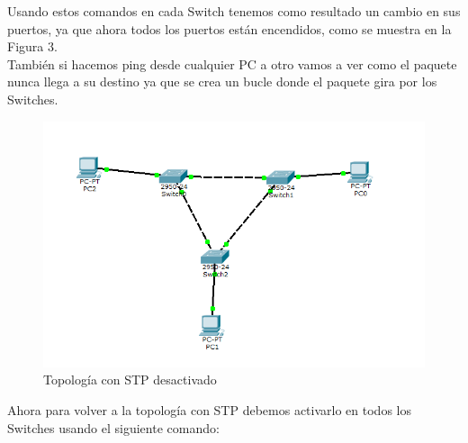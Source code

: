 \documentclass[onecolumn,11pts]{IEEEtran}
\begin{document}
Usando estos comandos en cada Switch tenemos como resultado un cambio en sus puertos, ya que ahora todos los puertos están encendidos, como se muestra en la Figura 3.\\También si hacemos ping desde cualquier PC a otro vamos a ver como el paquete nunca llega a su destino ya que se crea un bucle donde el paquete gira por los Switches.
\begin{figure}[h!]
\centering
 \includegraphics[scale=0.5]{stpapagado}
\caption{Topología con STP desactivado}
\label{fig:stpapagado}
\end{figure}

\newpage
Ahora para volver a la topología con STP debemos activarlo en todos los Switches usando el siguiente comando:
\end{document}
